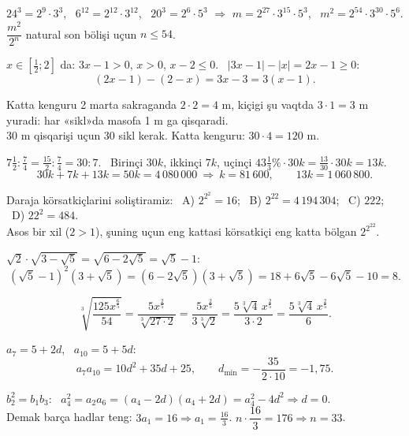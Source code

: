 




$24^3=2^9\cdot3^3$, \ $6^{12}=2^{12}\cdot3^{12}$, \ $20^3=2^6\cdot5^3$ $\Rightarrow$ $m=2^{27}\cdot3^{15}\cdot5^3$, \ $m^2=2^{54}\cdot3^{30}\cdot5^6$.\\
$\dfrac{m^2}{2^n}$ natural son bölişi uçun $n\le54$.

$x\in\left[\frac12;2\right]$ da: $3x-1>0$, $x>0$, $x-2\le0$. \ $|3x-1|-|x|=2x-1\ge0$:
\[(2x-1)-(2-x)=3x-3=3(x-1).\]

Katta kenguru 2 marta sakraganda $2\cdot2=4$ m, kiçigi şu vaqtda $3\cdot1=3$ m yuradi: har «sikl»da masofa 1 m ga qisqaradi.\\
30 m qisqarişi uçun 30 sikl kerak. Katta kenguru: $30\cdot4=120$ m.

$7\frac12:\frac74=\frac{15}2:\frac74=30:7$. \ Birinçi $30k$, ikkinçi $7k$, uçinçi $43\frac13\%\cdot30k=\frac{13}{30}\cdot30k=13k$.
\[30k+7k+13k=50k=4\,080\,000\ \Rightarrow\ k=81\,600,\qquad 13k=1\,060\,800.\]

Daraja körsatkiçlarini soliştiramiz: \ A) $2^{2^2}=16$; \ B) $2^{22}=4\,194\,304$; \ C) $222$; \ D) $22^2=484$.\\
Asos bir xil ($2>1$), şuning uçun eng kattasi körsatkiçi eng katta bölgan $2^{2^{22}}$.

$\sqrt2\cdot\sqrt{3-\sqrt5}=\sqrt{6-2\sqrt5}=\sqrt5-1$:
\[(\sqrt5-1)^2(3+\sqrt5)=(6-2\sqrt5)(3+\sqrt5)=18+6\sqrt5-6\sqrt5-10=8.\]

\[\sqrt[3]{\frac{125x^{\frac65}}{54}}=\frac{5x^{\frac25}}{\sqrt[3]{27\cdot2}}=\frac{5x^{\frac25}}{3\sqrt[3]2}=\frac{5\sqrt[3]4\,x^{\frac25}}{3\cdot2}=\frac{5\sqrt[3]4\,x^{\frac25}}6.\]

$a_7=5+2d$, \ $a_{10}=5+5d$:
\[a_7a_{10}=10d^2+35d+25,\qquad d_{\min}=-\frac{35}{2\cdot10}=-1{,}75.\]

$b_2^2=b_1b_3$: \ $a_4^2=a_2a_6=(a_4-2d)(a_4+2d)=a_4^2-4d^2\Rightarrow d=0$.\\
Demak barça hadlar teng: $3a_1=16\Rightarrow a_1=\frac{16}3$. \quad $n\cdot\dfrac{16}3=176\Rightarrow n=33$.

